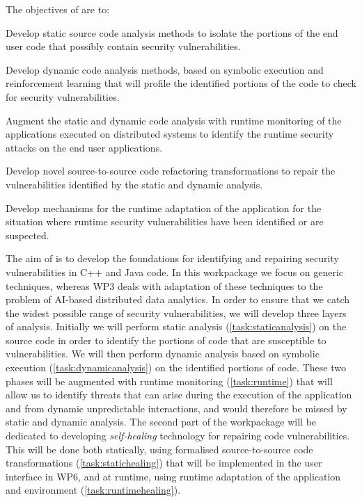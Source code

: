 \addtocounter{wpno}{1}
\begin{Workpackage}{\thewpno}
\WPTitle{\wpname{\thewpno}}



\begin{WPObjectives}
The objectives of \theWP{} are to:
\begin{compactitem}
\item Develop static source code analysis methods to isolate the portions of the end user code that possibly contain security vulnerabilities.
\item Develop dynamic code analysis methods, based on symbolic execution and reinforcement learning that will profile the identified portions of the code to check for security vulnerabilities.
\item Augment the static and dynamic code analysis with runtime monitoring of the applications executed on distributed systems to identify the runtime security attacks on the end user applications.
\item Develop novel source-to-source code refactoring transformations to repair the vulnerabilities identified by the static and dynamic analysis.
\item Develop mechanisms for the runtime adaptation of the application for the situation where runtime security vulnerabilities have been identified or are suspected.
\end{compactitem}
\end{WPObjectives}

\begin{WPDescription}
The aim of \theWP{} is to develop the foundations %
for identifying and repairing security vulnerabilities in C++ and Java code. In this workpackage we focus on generic techniques, whereas WP3 deals with adaptation of these techniques to the problem of AI-based distributed data analytics. In order to ensure that we catch the widest possible range of security vulnerabilities, we will develop three layers of analysis. Initially we will perform static analysis (\ref{task:staticanalysis}) on the source code in order to identify the portions of code that are susceptible to vulnerabilities. We will then perform dynamic analysis based on symbolic execution (\ref{task:dynamicanalysis}) on the identified portions of code. These two phases will be augmented with runtime monitoring (\ref{task:runtime}) that will allow us to identify threats that can arise during the execution of the application and from dynamic unpredictable interactions, and would therefore be missed by static and dynamic analysis. The second part of the workpackage will be dedicated to developing \emph{self-healing} technology for repairing code vulnerabilities. This will be done both statically, using formalised source-to-source code transformations ({\ref{task:statichealing}}) that will be implemented in the user interface in WP6, and at runtime, using runtime adaptation of the application and environment (\ref{task:runtimehealing}).
\end{WPDescription}


\end{Workpackage}
